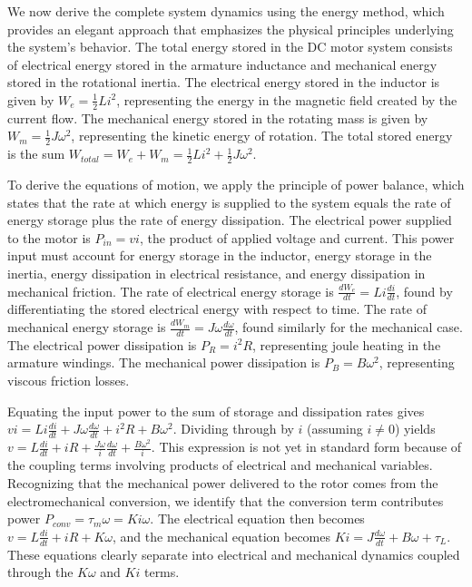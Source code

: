 We now derive the complete system dynamics using the energy method, which provides an elegant approach that emphasizes the physical principles underlying the system's behavior. The total energy stored in the DC motor system consists of electrical energy stored in the armature inductance and mechanical energy stored in the rotational inertia. The electrical energy stored in the inductor is given by $W_e = \frac{1}{2} L i^2$, representing the energy in the magnetic field created by the current flow. The mechanical energy stored in the rotating mass is given by $W_m = \frac{1}{2} J \omega^2$, representing the kinetic energy of rotation. The total stored energy is the sum $W_{total} = W_e + W_m = \frac{1}{2} L i^2 + \frac{1}{2} J \omega^2$.

To derive the equations of motion, we apply the principle of power balance, which states that the rate at which energy is supplied to the system equals the rate of energy storage plus the rate of energy dissipation. The electrical power supplied to the motor is $P_{in} = v i$, the product of applied voltage and current. This power input must account for energy storage in the inductor, energy storage in the inertia, energy dissipation in electrical resistance, and energy dissipation in mechanical friction. The rate of electrical energy storage is $\frac{dW_e}{dt} = L i \frac{di}{dt}$, found by differentiating the stored electrical energy with respect to time. The rate of mechanical energy storage is $\frac{dW_m}{dt} = J \omega \frac{d\omega}{dt}$, found similarly for the mechanical case. The electrical power dissipation is $P_{R} = i^2 R$, representing joule heating in the armature windings. The mechanical power dissipation is $P_{B} = B \omega^2$, representing viscous friction losses.

Equating the input power to the sum of storage and dissipation rates gives $v i = L i \frac{di}{dt} + J \omega \frac{d\omega}{dt} + i^2 R + B \omega^2$. Dividing through by $i$ (assuming $i \neq 0$) yields $v = L \frac{di}{dt} + i R + \frac{J \omega}{i} \frac{d\omega}{dt} + \frac{B \omega^2}{i}$. This expression is not yet in standard form because of the coupling terms involving products of electrical and mechanical variables. Recognizing that the mechanical power delivered to the rotor comes from the electromechanical conversion, we identify that the conversion term contributes power $P_{conv} = \tau_m \omega = K i \omega$. The electrical equation then becomes $v = L \frac{di}{dt} + i R + K \omega$, and the mechanical equation becomes $K i = J \frac{d\omega}{dt} + B \omega + \tau_L$. These equations clearly separate into electrical and mechanical dynamics coupled through the $K\omega$ and $Ki$ terms.

